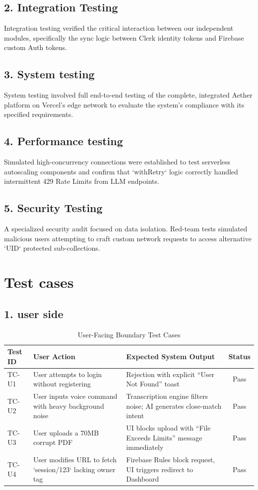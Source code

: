 \subsection{2. Integration Testing}
Integration testing verified the critical interaction between our independent modules, specifically the sync logic between Clerk identity tokens and Firebase custom Auth tokens.

\subsection{3. System testing}
System testing involved full end-to-end testing of the complete, integrated Aether platform on Vercel's edge network to evaluate the system's compliance with its specified requirements.

\subsection{4. Performance testing}
Simulated high-concurrency connections were established to test serverless autoscaling components and confirm that `withRetry` logic correctly handled intermittent 429 Rate Limits from LLM endpoints.

\subsection{5. Security Testing}
A specialized security audit focused on data isolation. Red-team tests simulated malicious users attempting to craft custom network requests to access alternative `UID` protected sub-collections.

\section{Test cases}

\subsection{1. user side}
\begin{table}[h!]
\centering
\begin{tabular}{|l|p{4cm}|p{4cm}|c|}
\hline
\textbf{Test ID} & \textbf{User Action} & \textbf{Expected System Output} & \textbf{Status} \\ \hline
TC-U1 & User attempts to login without registering & Rejection with explicit ``User Not Found'' toast & Pass \\ \hline
TC-U2 & User inputs voice command with heavy background noise & Transcription engine filters noise; AI generates close-match intent & Pass \\ \hline
TC-U3 & User uploads a 70MB corrupt PDF & UI blocks upload with ``File Exceeds Limits'' message immediately & Pass \\ \hline
TC-U4 & User modifies URL to fetch `session/123` lacking owner tag & Firebase Rules block request, UI triggers redirect to Dashboard & Pass \\ \hline
\end{tabular}
\caption{User-Facing Boundary Test Cases}
\end{table}

